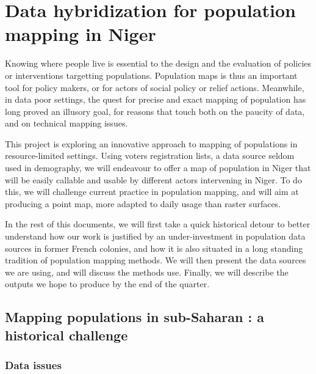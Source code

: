 \section[Using voters list to map population in the Sahel]{Data hybridization for population mapping in Niger}



Knowing where people live is essential to the design and the evaluation of policies or interventions targetting populations. Population maps is thus an important tool for policy makers, or for actors of social policy or relief actions. Meanwhile, in data poor settings, the quest for precise and exact mapping of population has long proved an illusory goal, for reasons that touch both on the paucity of data, and on technical mapping issues.

This  project is exploring an innovative approach to mapping of populations in resource-limited settings. Using voters registration lists, a data source seldom used in demography, we will endeavour to offer a map of population in Niger that will be easily callable and usable by different actors intervening in Niger. To do this, we will challenge current practice in population mapping, and will aim at producing a point map, more adapted to daily usage than raster surfaces.

In the rest of this documents, we will first take a quick historical detour to better understand how our work is justified by an under-investment in population data sources in former French colonies, and how it is also situated in a long standing tradition of population mapping methods. We will then present the data sources we are using, and will discuss the methods use. Finally, we will describe the outputs we hope to produce by the end of the quarter.


\subsection{Mapping populations in sub-Saharan : a historical challenge}

\subsubsection{Data issues}

